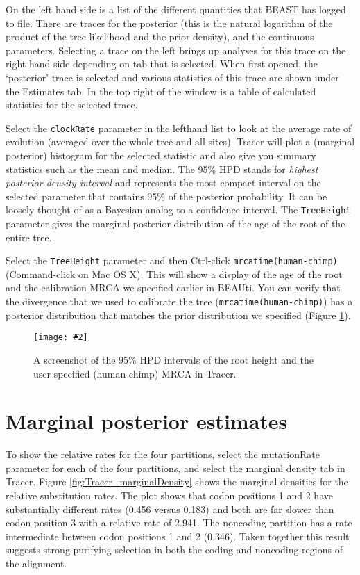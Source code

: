 \documentclass[12pt]{article}
\newcommand{\includeimage}[2][]{%
\texttt{[image: \#2]}
}
\begin{document}
On the left hand side is a list of the different quantities that BEAST has logged to file. 
There are traces for the posterior (this
is the natural logarithm of the product of the tree likelihood and the prior density), and the continuous parameters. Selecting a trace
on the left brings up analyses for this trace on the right hand side depending on tab that is selected. When first opened, the
`posterior' trace is selected and various statistics of this trace are shown under the Estimates tab.
In the top right of the window is a table of calculated statistics for the selected trace. 

Select the \texttt{clockRate} parameter in the lefthand list to look at
the average rate of evolution (averaged over the whole tree and all sites). Tracer will plot a (marginal posterior) histogram for the selected statistic and also give you
summary statistics such as the mean and median. The 95\% HPD stands for {\it highest posterior density interval} and represents the most compact interval on the selected parameter that contains 95\% of the posterior probability. It can be loosely thought of as a Bayesian analog to a confidence interval. The \texttt{TreeHeight} parameter gives the marginal posterior distribution of the age of the root of the entire tree.

Select the \texttt{TreeHeight} parameter and then Ctrl-click \texttt{mrcatime(human-chimp)}  (Command-click on Mac OS X). This will show a display of the age of the root and the calibration MRCA we specified earlier in BEAUti. You can verify that the divergence that we used to calibrate the tree
(\texttt{mrcatime(human-chimp)}) has a posterior distribution that matches the prior distribution we specified (Figure \ref{fig:Tracer_divergences}).

\begin{figure}
\centering	
\includeimage[width=0.9\textwidth]{figures/Tracer_divergences}
\caption{A screenshot of the 95\% HPD intervals of the root height and the user-specified (human-chimp) MRCA in Tracer.}
\label{fig:Tracer_divergences}
\end{figure}

\section{Marginal posterior estimates}

To show the relative rates for the four partitions, select the mutationRate parameter for each of the four partitions, and select the marginal density tab in Tracer.
Figure \ref{fig:Tracer_marginalDensity} shows the marginal densities for the relative substitution rates. The
plot shows that codon positions 1 and 2 have substantially different rates (0.456
versus 0.183) and both are far slower than codon position 3 with a relative rate of
2.941. The noncoding partition has a rate intermediate between codon positions
1 and 2 (0.346). Taken together this result suggests strong purifying selection in
both the coding and noncoding regions of the alignment.
\end{document}
